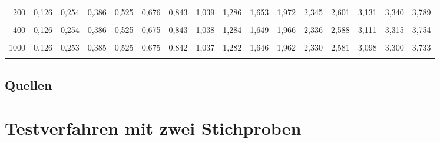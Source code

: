 \documentclass[
  ngerman,
]{article}
\begin{document}
\begin{table}[!h]
{\begin{tabular}{>{}r|rrrrrrrrrrrrrrr}
200 & 0,126 & 0,254 & 0,386 & 0,525 & 0,676 & 0,843 & 1,039 & 1,286 & 1,653 & 1,972 & 2,345 & 2,601 & 3,131 & 3,340 & 3,789\\
\addlinespace
\cellcolor{gray!6}{300} & \cellcolor{gray!6}{0,126} & \cellcolor{gray!6}{0,254} & \cellcolor{gray!6}{0,386} & \cellcolor{gray!6}{0,525} & \cellcolor{gray!6}{0,675} & \cellcolor{gray!6}{0,843} & \cellcolor{gray!6}{1,038} & \cellcolor{gray!6}{1,284} & \cellcolor{gray!6}{1,650} & \cellcolor{gray!6}{1,968} & \cellcolor{gray!6}{2,339} & \cellcolor{gray!6}{2,592} & \cellcolor{gray!6}{3,118} & \cellcolor{gray!6}{3,323} & \cellcolor{gray!6}{3,765}\\
400 & 0,126 & 0,254 & 0,386 & 0,525 & 0,675 & 0,843 & 1,038 & 1,284 & 1,649 & 1,966 & 2,336 & 2,588 & 3,111 & 3,315 & 3,754\\
\cellcolor{gray!6}{500} & \cellcolor{gray!6}{0,126} & \cellcolor{gray!6}{0,253} & \cellcolor{gray!6}{0,386} & \cellcolor{gray!6}{0,525} & \cellcolor{gray!6}{0,675} & \cellcolor{gray!6}{0,842} & \cellcolor{gray!6}{1,038} & \cellcolor{gray!6}{1,283} & \cellcolor{gray!6}{1,648} & \cellcolor{gray!6}{1,965} & \cellcolor{gray!6}{2,334} & \cellcolor{gray!6}{2,586} & \cellcolor{gray!6}{3,107} & \cellcolor{gray!6}{3,310} & \cellcolor{gray!6}{3,747}\\
1000 & 0,126 & 0,253 & 0,385 & 0,525 & 0,675 & 0,842 & 1,037 & 1,282 & 1,646 & 1,962 & 2,330 & 2,581 & 3,098 & 3,300 & 3,733\\
\cellcolor{gray!6}{$z$} & \cellcolor{gray!6}{0,126} & \cellcolor{gray!6}{0,253} & \cellcolor{gray!6}{0,385} & \cellcolor{gray!6}{0,524} & \cellcolor{gray!6}{0,674} & \cellcolor{gray!6}{0,842} & \cellcolor{gray!6}{1,036} & \cellcolor{gray!6}{1,282} & \cellcolor{gray!6}{1,645} & \cellcolor{gray!6}{1,960} & \cellcolor{gray!6}{2,326} & \cellcolor{gray!6}{2,576} & \cellcolor{gray!6}{3,090} & \cellcolor{gray!6}{3,291} & \cellcolor{gray!6}{3,719}\\
\bottomrule
\end{tabular}}
\end{table}

\pagebreak

\hypertarget{quellen-4}{%
\subsection{Quellen}\label{quellen-4}}

\hypertarget{testverfahren-mit-zwei-stichproben}{%
\section{Testverfahren mit zwei Stichproben}\label{testverfahren-mit-zwei-stichproben}}
\end{document}
